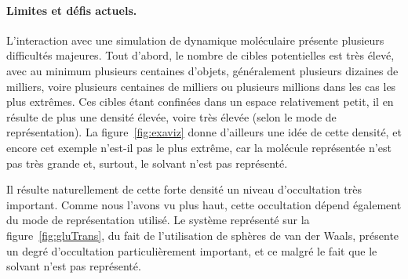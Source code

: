 	
	\paragraph{Limites et défis actuels.}
	L'interaction avec une simulation de dynamique moléculaire présente plusieurs difficultés majeures. Tout d'abord, le nombre de cibles potentielles est très élevé, avec au minimum plusieurs centaines d'objets, généralement plusieurs dizaines de milliers, voire plusieurs centaines de milliers ou plusieurs millions dans les cas les plus extrêmes. Ces cibles étant confinées dans un espace relativement petit, il en résulte de plus une densité élevée, voire très élevée (selon le mode de représentation). La figure~\ref{fig:exaviz} donne d'ailleurs une idée de cette densité, et encore cet exemple n'est-il pas le plus extrême, car la molécule représentée n'est pas très grande et, surtout, le solvant n'est pas représenté.
	
	Il résulte naturellement de cette forte densité un niveau d'occultation très important. Comme nous l'avons vu plus haut, cette occultation dépend également du mode de représentation utilisé. Le système représenté sur la figure~\ref{fig:gluTrans}, du fait de l'utilisation de sphères de van der Waals, présente un degré d'occultation particulièrement important, et ce malgré le fait que le solvant n'est pas représenté.
	
